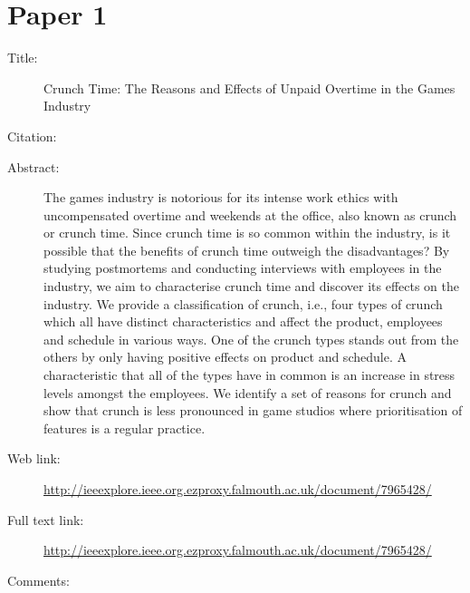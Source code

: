 \documentclass{scrartcl}
\begin{document}
\section*{Paper 1}
\begin{description}
\item[Title:]Crunch Time: The Reasons and Effects of Unpaid Overtime in the Games Industry
\item[Citation:] \cite{edholm2017crunch}
\item[Abstract:] The games industry is notorious for its intense work ethics with uncompensated overtime and weekends at the office, also known as crunch or crunch time. Since crunch time is so common within the industry, is it possible that the benefits of crunch time outweigh the disadvantages? By studying postmortems and conducting interviews with employees in the industry, we aim to characterise crunch time and discover its effects on the industry. We provide a classification of crunch, i.e., four types of crunch which all have distinct characteristics and affect the product, employees and schedule in various ways. One of the crunch types stands out from the others by only having positive effects on product and schedule. A characteristic that all of the types have in common is an increase in stress levels amongst the employees. We identify a set of reasons for crunch and show that crunch is less pronounced in game studios where prioritisation of features is a regular practice.
\item[Web link:] \url{http://ieeexplore.ieee.org.ezproxy.falmouth.ac.uk/document/7965428/}
\item[Full text link:] \url{http://ieeexplore.ieee.org.ezproxy.falmouth.ac.uk/document/7965428/}
\item[Comments:] 
\end{description}
\end{document}
